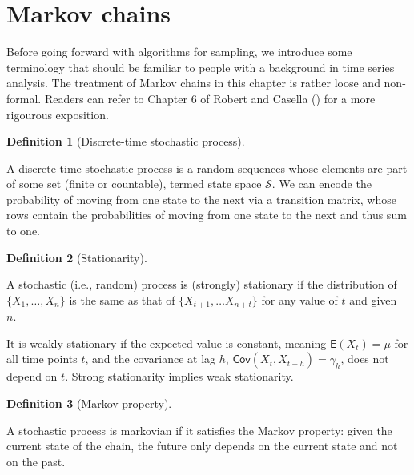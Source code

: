 \documentclass[
  11pt,
  letterpaper,
]{scrbook}
\theoremstyle{definition}
\theoremstyle{plain}
\theoremstyle{plain}
\theoremstyle{plain}
\theoremstyle{definition}
\theoremstyle{definition}
\newtheorem{definition}{Definition}[chapter]
\theoremstyle{plain}
\theoremstyle{plain}
\theoremstyle{remark}
\begin{document}
\section{Markov chains}\label{markov-chains}

Before going forward with algorithms for sampling, we introduce some
terminology that should be familiar to people with a background in time
series analysis. The treatment of Markov chains in this chapter is
rather loose and non-formal. Readers can refer to Chapter 6 of Robert
and Casella () for a more
rigourous exposition.

\begin{definition}[Discrete-time stochastic
process]\protect\hypertarget{def-stoch-proc}{}\label{def-stoch-proc}

A discrete-time stochastic process is a random sequences whose elements
are part of some set (finite or countable), termed state space
\(\mathcal{S}.\) We can encode the probability of moving from one state
to the next via a transition matrix, whose rows contain the
probabilities of moving from one state to the next and thus sum to one.

\end{definition}

\begin{definition}[Stationarity]\protect\hypertarget{def-weak-stationarity}{}\label{def-weak-stationarity}

A stochastic (i.e., random) process is (strongly) stationary if the
distribution of \(\{X_1, \ldots, X_n\}\) is the same as that of
\(\{X_{t+1}, \ldots X_{n+t}\}\) for any value of \(t\) and given \(n.\)

It is weakly stationary if the expected value is constant, meaning
\(\mathsf{E}(X_t) = \mu\) for all time points \(t\), and the covariance
at lag \(h\), \(\mathsf{Cov}(X_t, X_{t+h}) = \gamma_h\), does not depend
on \(t\). Strong stationarity implies weak stationarity.

\end{definition}

\begin{definition}[Markov
property]\protect\hypertarget{def-markov-property}{}\label{def-markov-property}

A stochastic process is markovian if it satisfies the Markov property:
given the current state of the chain, the future only depends on the
current state and not on the past.

\end{definition}
\end{document}
